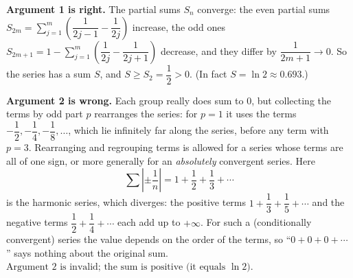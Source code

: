 \textbf{Argument 1 is right.} The partial sums $S_n$ converge: the even partial sums $S_{2m}=\sum_{j=1}^m\left(\dfrac{1}{2j-1}-\dfrac{1}{2j}\right)$ increase, the odd ones $S_{2m+1}=1-\sum_{j=1}^m\left(\dfrac{1}{2j}-\dfrac{1}{2j+1}\right)$ decrease, and they differ by $\dfrac{1}{2m+1}\to0$. So the series has a sum $S$, and $S\ge S_2=\dfrac{1}{2}>0$. (In fact $S=\ln2\approx0.693$.)

\textbf{Argument 2 is wrong.} Each group really does sum to $0$, but collecting the terms by odd part $p$ rearranges the series: for $p=1$ it uses the terms $-\dfrac{1}{2},-\dfrac{1}{4},-\dfrac{1}{8},\dots$, which lie infinitely far along the series, before any term with $p=3$. Rearranging and regrouping terms is allowed for a series whose terms are all of one sign, or more generally for an \emph{absolutely} convergent series. Here
\[
\sum\left|\pm\dfrac{1}{n}\right|=1+\dfrac{1}{2}+\dfrac{1}{3}+\cdots
\]
is the harmonic series, which diverges: the positive terms $1+\dfrac{1}{3}+\dfrac{1}{5}+\cdots$ and the negative terms $\dfrac{1}{2}+\dfrac{1}{4}+\cdots$ each add up to $+\infty$. For such a (conditionally convergent) series the value depends on the order of the terms, so ``$0+0+0+\cdots$'' says nothing about the original sum. $\boxed{\text{Argument 2 is invalid; the sum is positive (it equals }\ln 2)}$.
